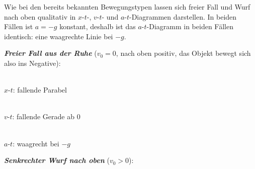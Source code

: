 \documentclass[addpoints,11pt,a4paper]{exam}
\begin{document}
\begin{theoriebox}
Wie bei den bereits bekannten Bewegungstypen lassen sich freier Fall und
Wurf nach oben qualitativ in $x$-$t$-, $v$-$t$- und $a$-$t$-Diagrammen
darstellen. In beiden Fällen ist $a=-g$ konstant, deshalb ist das
$a$-$t$-Diagramm in beiden Fällen identisch: eine waagrechte Linie bei
$-g$.

\textbf{\emph{Freier Fall aus der Ruhe}} ($v_0=0$, nach oben positiv, das
Objekt bewegt sich also ins Negative):

\begin{center}
\begin{minipage}{0.30\linewidth}\centering
{}\\[-0.2em]
{\scriptsize $x$-$t$: fallende Parabel}
\end{minipage}\hfill
\begin{minipage}{0.30\linewidth}\centering
{}\\[-0.2em]
{\scriptsize $v$-$t$: fallende Gerade ab $0$}
\end{minipage}\hfill
\begin{minipage}{0.30\linewidth}\centering
{}\\[-0.2em]
{\scriptsize $a$-$t$: waagrecht bei $-g$}
\end{minipage}
\end{center}

\textbf{\emph{Senkrechter Wurf nach oben}} ($v_0>0$):


\end{theoriebox}
\end{document}
